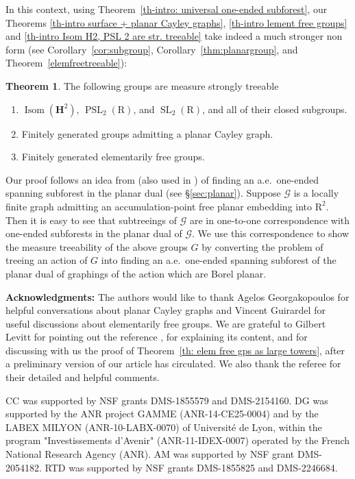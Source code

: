\documentclass[11pt]{amsart}
\theoremstyle{definition}
\newtheorem{thmintro}{Theorem}
\theoremstyle{plain}
\newcommand{\<}{\langle}
\renewcommand{\>}{\rangle}
\DeclareMathOperator{\Isom}{Isom}
\DeclareMathOperator{\SL}{SL}
\DeclareMathOperator{\PSL}{PSL}
\newcommand{\R}{\bm{\mathrm{R}}}
\newcommand{\Ggraph}{\mathcal{G}}
\newcommand\Hmath{\mathbf{H}}
\newcommand{\pmp}{\text{p.m.p.}}
\begin{document}
In this context, using Theorem~\ref{th-intro: universal one-ended subforest},
our Theorems \ref{th-intro surface + planar Cayley graphs},
\ref{th-intro lement free groups} and
\ref{th-intro Isom H2, PSL 2 are str. treeable} take indeed a much stronger non \pmp{} form (see
 Corollary~\ref{cor:subgroup}, Corollary~\ref{thm:planargroup},
and Theorem~\ref{elemfreetreeable}):
%
\begin{thmintro}
  The following groups are measure strongly treeable
  \begin{enumerate}
    \item $\Isom(\Hmath^2)$, $\PSL_2(\R )$, and $\SL_2(\R )$, and all of their closed subgroups.
    \item Finitely generated groups admitting a planar Cayley graph.
    \item Finitely generated elementarily free groups.
  \end{enumerate}
\end{thmintro}
%
Our proof follows an idea from \cite{BLPS01} (also used in \cite{Ga05}) of finding an a.e.\ one-ended spanning subforest
in the planar dual (see \S\ref{sec:planar}). Suppose $\Ggraph$ is a locally finite graph admitting an accumulation-point
free planar embedding into $\R^2$. Then it is easy to see that subtreeings of $\Ggraph$
are in one-to-one correspondence with one-ended subforests in the planar
dual of $\Ggraph$. We use this correspondence to show the measure
treeability of the above groups $G$ by converting the problem of treeing an
action of $G$ into finding an a.e.\ one-ended spanning subforest of the planar dual
of graphings of the action which are Borel planar.

\bigskip
\noindent
{\bf Acknowledgments:}
The authors would like to thank
Agelos Georgakopoulos for helpful conversations about planar Cayley graphs and
Vincent Guirardel for useful discussions about elementarily free groups.
We are grateful to Gilbert Levitt for pointing out the reference \cite{Guirardel-Levitt-Sklinos-2020}, for explaining its content, and for discussing with us the proof of Theorem~\ref{th: elem free gps as large towers}, after a preliminary version of our article has circulated.
We also thank the referee for their detailed and helpful comments.

CC was supported by NSF grants DMS-1855579 and DMS-2154160. DG was supported by the ANR project
GAMME (ANR-14-CE25-0004) and by the LABEX MILYON (ANR-10-LABX-0070) of
Université de Lyon, within the program "Investissements d'Avenir"
(ANR-11-IDEX-0007) operated by the French National Research Agency (ANR). AM was
supported by NSF grant DMS-2054182. RTD was supported by NSF grants
DMS-1855825 and DMS-2246684.
\end{document}
